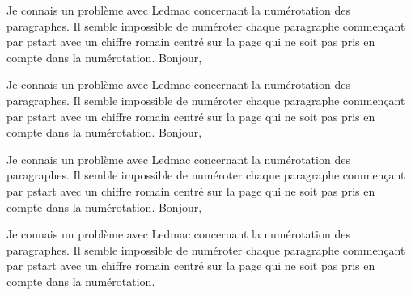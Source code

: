 \documentclass{article}
\begin{document}
Je connais un problème avec Ledmac concernant la numérotation des paragraphes. Il semble impossible de numéroter chaque paragraphe commençant par pstart avec un chiffre romain centré sur la page qui ne soit pas pris en compte dans la numérotation.\pend
\pstart Bonjour,

Je connais un problème avec Ledmac concernant la numérotation des paragraphes. Il semble impossible de numéroter chaque paragraphe commençant par pstart avec un chiffre romain centré sur la page qui ne soit pas pris en compte dans la numérotation.\pend
\pstart Bonjour,

Je connais un problème avec Ledmac concernant la numérotation des paragraphes. Il semble impossible de numéroter chaque paragraphe commençant par pstart avec un chiffre romain centré sur la page qui ne soit pas pris en compte dans la numérotation.\pend
\pstart Bonjour,

Je connais un problème avec Ledmac concernant la numérotation des paragraphes. Il semble impossible de numéroter chaque paragraphe commençant par pstart avec un chiffre romain centré sur la page qui ne soit pas pris en compte dans la numérotation.\pend
\endnumbering
\end{document}

